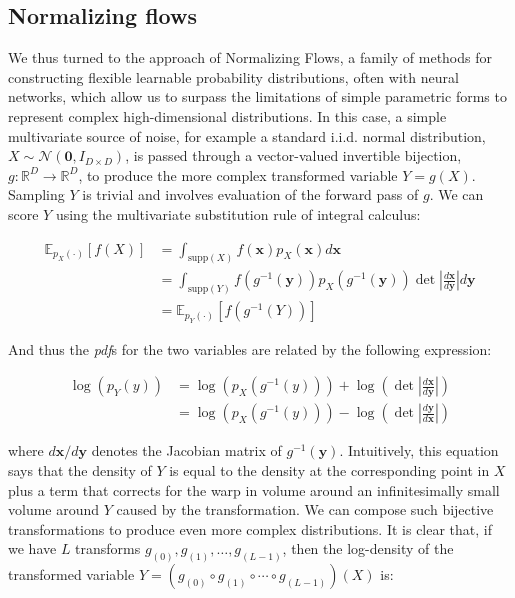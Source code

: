 \documentclass{scrartcl} %
\begin{document}
	\subsection*{Normalizing flows}
	We thus turned to the approach of Normalizing Flows, a family of methods for constructing flexible learnable probability distributions, often with neural networks, which allow us to surpass the limitations of simple parametric forms to represent complex high-dimensional distributions. In this case, a simple multivariate source of noise, for example a standard i.i.d. normal distribution, $X\sim\mathcal{N}(\mathbf{0},I_{D\times D})$, is passed through a vector-valued invertible bijection, $g:\mathbb{R}^D\rightarrow\mathbb{R}^D$, to produce the more complex transformed variable $Y=g(X)$.
	Sampling $Y$ is trivial and involves evaluation of the forward pass of $g$. We can score $Y$ using the multivariate substitution rule of integral calculus:
	
	\begin{equation*}
  \begin{aligned}
			\mathbb{E}_{p_X(\cdot)}\left[f(X)\right] &= \int_{\text{supp}(X)}f(\mathbf{x})p_X(\mathbf{x})d\mathbf{x}\\
			&= \int_{\text{supp}(Y)}f(g^{-1}(\mathbf{y}))p_X(g^{-1}(\mathbf{y}))\det\left|\frac{d\mathbf{x}}{d\mathbf{y}}\right|d\mathbf{y}\\
			&= \mathbb{E}_{p_Y(\cdot)}\left[f(g^{-1}(Y))\right]
			\end{aligned}
		\end{equation*}
	
And thus the \emph{pdf}s for the two variables are related by the following expression:

\begin{equation*}
	\begin{aligned}
		\log(p_Y(y)) &= \log(p_X(g^{-1}(y)))+\log\left(\det\left|\frac{d\mathbf{x}}{d\mathbf{y}}\right|\right)\\
		&= \log(p_X(g^{-1}(y)))-\log\left(\det\left|\frac{d\mathbf{y}}{d\mathbf{x}}\right|\right)
		\end{aligned}
\end{equation*}

where $d\mathbf{x}/d\mathbf{y}$ denotes the Jacobian matrix of $g^{-1}(\mathbf{y})$.
Intuitively, this equation says that the density of $Y$ is equal to the density at the corresponding point in $X$ plus a term that corrects for the warp in volume around an infinitesimally small volume around $Y$ caused by the transformation.
	We can compose such bijective transformations to produce even more complex distributions. It is clear that, if we have $L$ transforms $g_{(0)}, g_{(1)},\ldots,g_{(L-1)}$, then the log-density of the transformed variable $Y=(g_{(0)}\circ g_{(1)}\circ\cdots\circ g_{(L-1)})(X)$ is:
	
\end{document}
